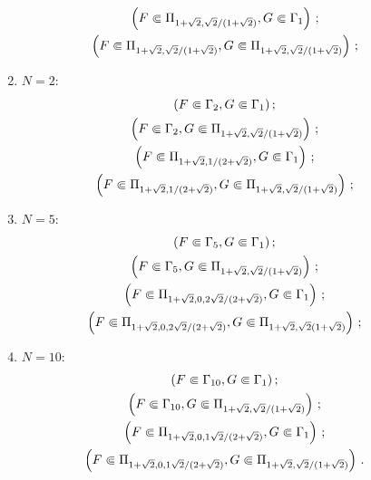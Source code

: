 \begin{multicols}{2}
\begin{enumerate}[(1)]
\noindent
\begin{gather*}
 \hspace*{-8mm}  \left( F\Subset \Pi_{1+\sqrt{2},{\sqrt{2}}/({1+\sqrt{2}})},G\Subset \Gamma_1\right)\,;\\
 \hspace*{-8mm} \left( F\Subset \Pi_{1+\sqrt{2},{\sqrt{2}}/({1+\sqrt{2}})}, G\Subset 
\Pi_{1+\sqrt{2},{\sqrt{2}}/({1+\sqrt{2}})}\right)\,;
  \end{gather*}
  \item $ N=2$:
    \begin{gather*}
   \hspace*{-8mm}  (F\Subset \Gamma_2, G\Subset \Gamma_1)\,;\\
   \hspace*{-8mm}  \left( F\Subset \Gamma_2,G\Subset 
\Pi_{1+\sqrt{2},{\sqrt{2}}/({1+\sqrt{2}})}\right)\,;\\
 \hspace*{-8mm}  \left( F\Subset \Pi_{1+\sqrt{2},{1}/({2+\sqrt{2}})},G\Subset \Gamma_1\right)\,;\\
 \hspace*{-8mm}  \left( 
  F\Subset \Pi_{1+\sqrt{2},{1}/({2+\sqrt{2}})}, G\Subset 
\Pi_{1+\sqrt{2},{\sqrt{2}}/({1+\sqrt{2}})}\right)\,;
  \end{gather*}
\item $N=5$:
  \begin{gather*}
   \hspace*{-8mm} (F\Subset \Gamma_5, G\Subset \Gamma_1)\,;\\
   \hspace*{-8mm} \left( F\Subset \Gamma_5,G\Subset 
\Pi_{1+\sqrt{2},{\sqrt{2}}/({1+\sqrt{2}})}\right)\,;\\
  \hspace*{-8mm} \left( F\Subset \Pi_{1+\sqrt{2},{0{,}2\sqrt{2}}/({2+\sqrt{2}})},G\Subset 
\Gamma_1\right)\,;\\
  \hspace*{-8mm} \left( 
  F\Subset \Pi_{1+\sqrt{2},{0{,}2\sqrt{2}}/({2+\sqrt{2}})}, G\Subset 
\Pi_{1+\sqrt{2},{\sqrt{2}}({1+\sqrt{2}})}\right)\,;
  \end{gather*}
\item $  N=10$:
  \begin{gather*}
   \hspace*{-8mm} (F\Subset \Gamma_{10}, G\Subset \Gamma_1)\,;\\
    \hspace*{-8mm}\left( F\Subset 
\Gamma_{10},G\Subset \Pi_{1+\sqrt{2},{\sqrt{2}}/({1+\sqrt{2}})}\right)\,;\\
 \hspace*{-8mm}  \left( F\Subset \Pi_{1+\sqrt{2},{0{,}1\sqrt{2}}/({2+\sqrt{2}})},G\Subset 
\Gamma_1\right)\,;\\
  \hspace*{-8mm} \left( 
  F\Subset \Pi_{1+\sqrt{2},{0{,}1\sqrt{2}}/({2+\sqrt{2}})}, G\Subset 
\Pi_{1+\sqrt{2},{\sqrt{2}}/({1+\sqrt{2}})}\right)\,.
  \end{gather*}
  \end{enumerate}
  

\end{multicols}

